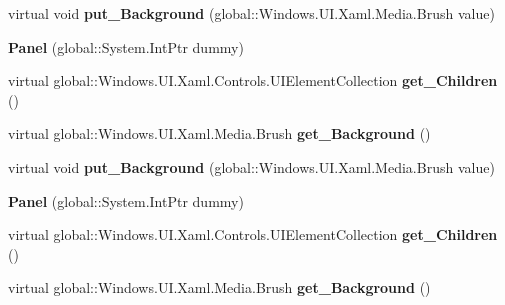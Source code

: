\begin{DoxyCompactItemize}
virtual void {\bfseries put\+\_\+\+Background} (global\+::\+Windows.\+U\+I.\+Xaml.\+Media.\+Brush value)
\item 
\mbox{\label{class_windows_1_1_u_i_1_1_xaml_1_1_controls_1_1_panel_a54383ce894f6c3de91f81d884cf66b58}} 
{\bfseries Panel} (global\+::\+System.\+Int\+Ptr dummy)
\item 
\mbox{\label{class_windows_1_1_u_i_1_1_xaml_1_1_controls_1_1_panel_af652e8d7f7eb0e90f25b776e09bf3dcf}} 
virtual global\+::\+Windows.\+U\+I.\+Xaml.\+Controls.\+U\+I\+Element\+Collection {\bfseries get\+\_\+\+Children} ()
\item 
\mbox{\label{class_windows_1_1_u_i_1_1_xaml_1_1_controls_1_1_panel_a61659c9c3ceb21efd89dbd5ddb273f97}} 
virtual global\+::\+Windows.\+U\+I.\+Xaml.\+Media.\+Brush {\bfseries get\+\_\+\+Background} ()
\item 
\mbox{\label{class_windows_1_1_u_i_1_1_xaml_1_1_controls_1_1_panel_a7cc43ef5117674ef84ccfbb8892c77e9}} 
virtual void {\bfseries put\+\_\+\+Background} (global\+::\+Windows.\+U\+I.\+Xaml.\+Media.\+Brush value)
\item 
\mbox{\label{class_windows_1_1_u_i_1_1_xaml_1_1_controls_1_1_panel_a54383ce894f6c3de91f81d884cf66b58}} 
{\bfseries Panel} (global\+::\+System.\+Int\+Ptr dummy)
\item 
\mbox{\label{class_windows_1_1_u_i_1_1_xaml_1_1_controls_1_1_panel_af652e8d7f7eb0e90f25b776e09bf3dcf}} 
virtual global\+::\+Windows.\+U\+I.\+Xaml.\+Controls.\+U\+I\+Element\+Collection {\bfseries get\+\_\+\+Children} ()
\item 
\mbox{\label{class_windows_1_1_u_i_1_1_xaml_1_1_controls_1_1_panel_a61659c9c3ceb21efd89dbd5ddb273f97}} 
virtual global\+::\+Windows.\+U\+I.\+Xaml.\+Media.\+Brush {\bfseries get\+\_\+\+Background} ()
\item 
\mbox{\label{class_windows_1_1_u_i_1_1_xaml_1_1_controls_1_1_panel_a7cc43ef5117674ef84ccfbb8892c77e9}} 

\end{DoxyCompactItemize}
